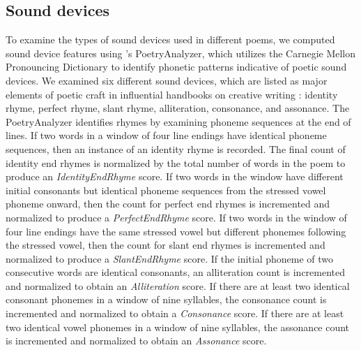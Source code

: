 \documentclass{book}
\begin{document}
\subsection{Sound devices}
To examine the types of sound devices used in different poems, we computed sound device features using \citet{Kaplan}'s PoetryAnalyzer, which utilizes the Carnegie Mellon Pronouncing Dictionary to identify phonetic patterns indicative of poetic sound devices. We examined six different sound devices, which are listed as major elements of poetic craft in influential handbooks on creative writing \citep{Burroway, PoetsCompanion}: identity rhyme, perfect rhyme, slant rhyme, alliteration, consonance, and assonance. The PoetryAnalyzer identifies rhymes by examining phoneme sequences at the end of lines. If two words in a window of four line endings have identical phoneme sequences, then an instance of an identity rhyme is recorded. The final count of identity end rhymes is normalized by the total number of words in the poem to produce an \emph{IdentityEndRhyme} score. If two words in the window have different initial consonants but identical phoneme sequences from the stressed vowel phoneme onward, then the count for perfect end rhymes is incremented and normalized to produce a \emph{PerfectEndRhyme} score. If two words in the window of four line endings have the same stressed vowel but different phonemes following the stressed vowel, then the count for slant end rhymes is incremented and normalized to produce a \emph{SlantEndRhyme} score. If the initial phoneme of two consecutive words are identical consonants, an alliteration count is incremented and normalized to obtain an \emph{Alliteration} score. If there are at least two identical consonant phonemes in a window of nine syllables, the consonance count is incremented and normalized to obtain a \emph{Consonance} score. If there are at least two identical vowel phonemes in a window of nine syllables, the assonance count is incremented and normalized to obtain an \emph{Assonance} score. 
\end{document}
